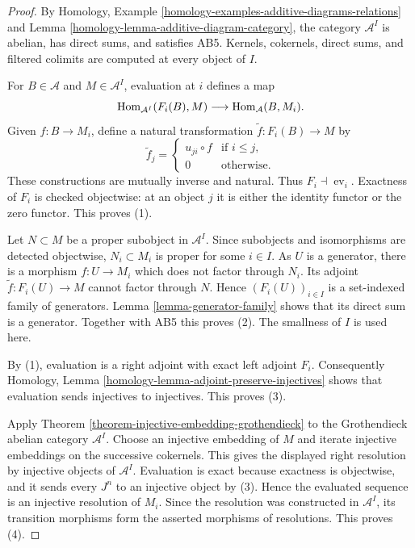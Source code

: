 \begin{proof}
By Homology, Example
\ref{homology-examples-additive-diagrams-relations} and Lemma
\ref{homology-lemma-additive-diagram-category}, the category
$\mathcal{A}^I$ is abelian, has direct sums, and satisfies AB5. Kernels,
cokernels, direct sums, and filtered colimits are computed at every object of
$I$.

For $B \in \mathcal{A}$ and $M \in \mathcal{A}^I$, evaluation at $i$
defines a map
$$
\mathop{\mathrm{Hom}}\nolimits_{\mathcal{A}^I}(F_i(B), M)
\longrightarrow
\mathop{\mathrm{Hom}}\nolimits_{\mathcal{A}}(B, M_i).
$$
Given $f : B \to M_i$, define a natural transformation
$\widetilde f : F_i(B) \to M$ by
$$
\widetilde f_j =
\begin{cases}
u_{ji} \circ f & \text{if } i \leq j, \\
0 & \text{otherwise.}
\end{cases}
$$
These constructions are mutually inverse and natural. Thus
$F_i \dashv \operatorname{ev}_i$. Exactness of $F_i$ is checked objectwise:
at an object $j$ it is either the identity functor or the zero functor. This
proves (1).

Let $N \subset M$ be a proper subobject in $\mathcal{A}^I$. Since subobjects
and isomorphisms are detected objectwise, $N_i \subset M_i$ is proper for
some $i \in I$. As $U$ is a generator, there is a morphism
$f : U \to M_i$ which does not factor through $N_i$. Its adjoint
$\widetilde f : F_i(U) \to M$ cannot factor through $N$. Hence
$(F_i(U))_{i \in I}$ is a set-indexed family of generators. Lemma
\ref{lemma-generator-family} shows that its direct sum is a generator.
Together with AB5 this proves (2). The smallness of $I$ is used here.

By (1), evaluation is a right adjoint with exact left adjoint $F_i$.
Consequently Homology, Lemma
\ref{homology-lemma-adjoint-preserve-injectives} shows that evaluation sends
injectives to injectives. This proves (3).

Apply Theorem \ref{theorem-injective-embedding-grothendieck} to the
Grothendieck abelian category $\mathcal{A}^I$. Choose an injective embedding
of $M$ and iterate injective embeddings on the successive cokernels. This
gives the displayed right resolution by injective objects of
$\mathcal{A}^I$. Evaluation is exact because exactness is objectwise, and it
sends every $J^n$ to an injective object by (3). Hence the evaluated sequence
is an injective resolution of $M_i$. Since the resolution was constructed in
$\mathcal{A}^I$, its transition morphisms form the asserted morphisms of
resolutions. This proves (4).
\end{proof}













